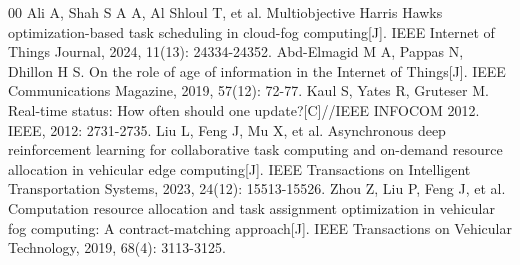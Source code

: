 \documentclass[conference]{IEEEtran}
\begin{document}
\begin{thebibliography}{00}
 Ali A, Shah S A A, Al Shloul T, et al. Multiobjective Harris Hawks optimization-based task scheduling in cloud-fog computing[J]. IEEE Internet of Things Journal, 2024, 11(13): 24334-24352.
 Abd-Elmagid M A, Pappas N, Dhillon H S. On the role of age of information in the Internet of Things[J]. IEEE Communications Magazine, 2019, 57(12): 72-77.
 Kaul S, Yates R, Gruteser M. Real-time status: How often should one update?[C]//IEEE INFOCOM 2012. IEEE, 2012: 2731-2735.
 Liu L, Feng J, Mu X, et al. Asynchronous deep reinforcement learning for collaborative task computing and on-demand resource allocation in vehicular edge computing[J]. IEEE Transactions on Intelligent Transportation Systems, 2023, 24(12): 15513-15526.
 Zhou Z, Liu P, Feng J, et al. Computation resource allocation and task assignment optimization in vehicular fog computing: A contract-matching approach[J]. IEEE Transactions on Vehicular Technology, 2019, 68(4): 3113-3125.
\end{thebibliography}
\end{document}
